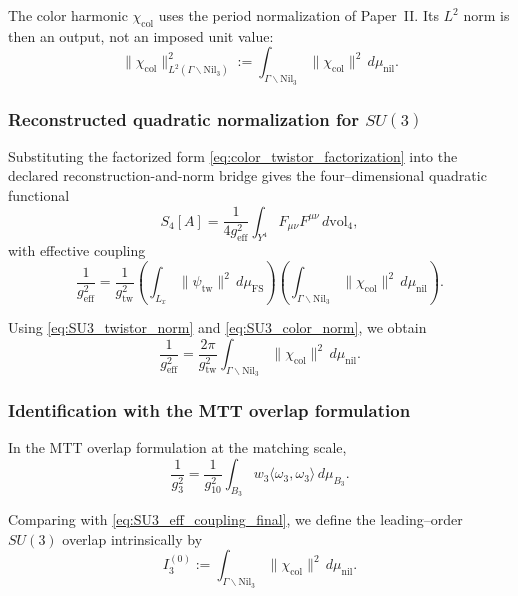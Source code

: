 \documentclass[11pt]{article}
\begin{document}
The color harmonic $\chi_{\mathrm{col}}$ uses the period normalization of
Paper~II. Its $L^2$ norm is then an output, not an imposed unit value:
\begin{equation}
\|\chi_{\mathrm{col}}\|_{L^2(\Gamma\backslash\mathrm{Nil}_3)}^2
:=
\int_{\Gamma\backslash\mathrm{Nil}_3}
\|\chi_{\mathrm{col}}\|^2\, d\mu_{\mathrm{nil}}.
\label{eq:SU3_color_norm}
\end{equation}

\subsubsection{Reconstructed quadratic normalization for
\texorpdfstring{$SU(3)$}{SU(3)}}

Substituting the factorized form \eqref{eq:color_twistor_factorization} into the
declared reconstruction-and-norm bridge gives the four--dimensional quadratic
functional
\begin{equation}
S_4[A]
=
\frac{1}{4g_{\mathrm{eff}}^2}
\int_{Y^4} F_{\mu\nu}F^{\mu\nu}\, d\mathrm{vol}_4,
\end{equation}
with effective coupling
\begin{equation}
\frac{1}{g_{\mathrm{eff}}^2}
=
\frac{1}{g_{\mathrm{tw}}^2}
\left(
\int_{L_x}\|\psi_{\mathrm{tw}}\|^2\, d\mu_{\mathrm{FS}}
\right)
\left(
\int_{\Gamma\backslash\mathrm{Nil}_3}
\|\chi_{\mathrm{col}}\|^2\, d\mu_{\mathrm{nil}}
\right).
\label{eq:SU3_eff_coupling}
\end{equation}

Using \eqref{eq:SU3_twistor_norm} and \eqref{eq:SU3_color_norm}, we obtain
\begin{equation}
\frac{1}{g_{\mathrm{eff}}^2}
=
\frac{2\pi}{g_{\mathrm{tw}}^2}
\int_{\Gamma\backslash\mathrm{Nil}_3}
\|\chi_{\mathrm{col}}\|^2\, d\mu_{\mathrm{nil}}.
\label{eq:SU3_eff_coupling_final}
\end{equation}

\subsubsection{Identification with the MTT overlap formulation}

In the MTT overlap formulation at the matching scale,
\begin{equation}
\frac{1}{g_3^2}
=
\frac{1}{g_{10}^2}
\int_{B_3}
w_3\langle \omega_3, \omega_3 \rangle\, d\mu_{B_3}.
\end{equation}

Comparing with \eqref{eq:SU3_eff_coupling_final}, we define the leading--order
$SU(3)$ overlap intrinsically by
\begin{equation}
I_3^{(0)}
:=
\int_{\Gamma\backslash\mathrm{Nil}_3}
\|\chi_{\mathrm{col}}\|^2\, d\mu_{\mathrm{nil}}.
\label{eq:SU3_overlap_def}
\end{equation}
\end{document}

